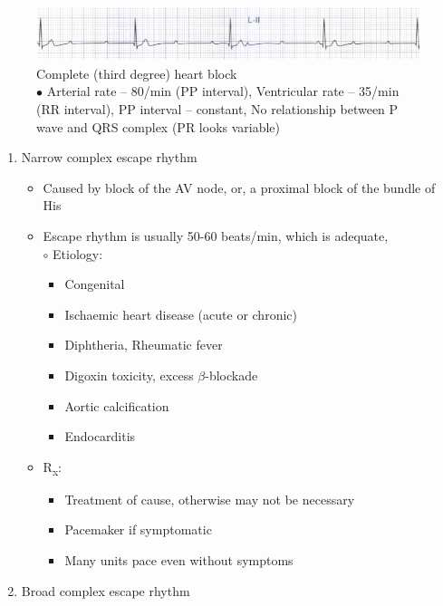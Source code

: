\documentclass[11pt,a4paper]{report}
\begin{document}
\begin{enumerate}
\begin{enumerate}
\begin{itemize}
		\end{itemize}
		\begin{figure}[htp]
			\centering \includegraphics[scale=.91]{ecg-heartblock-3.png}
			\centering \caption[Third degree heart block]{Complete (third degree) heart block\\$\bullet$ Arterial rate -- 80/min (PP interval), Ventricular rate -- 35/min (RR interval), PP interval -- constant, No relationship between P wave and QRS complex (PR looks variable) \cite{abdullah-ecg}}
			\label{ecg-heartblock-3}
		\end{figure}
		\begin{enumerate}
			\item Narrow complex escape rhythm
			\begin{itemize}
				\item Caused by block of the AV node, or, a proximal block of the bundle of His 
				\item Escape rhythm is usually 50-60 beats/min, which is adequate, \\
				{\color{red}$\circ$} Etiology:
				\begin{itemize}
					\item Congenital
					\item Ischaemic heart disease (acute or chronic)
					\item Diphtheria, Rheumatic fever
					\item Digoxin toxicity, excess $\beta$-blockade 
					\item Aortic calcification 
					\item Endocarditis 
				\end{itemize}
				\item R\textsubscript{x}:
				\begin{itemize}
					\item Treatment of cause, otherwise may not be necessary 
					\item Pacemaker if symptomatic
					\item Many units pace even without symptoms
				\end{itemize}
			\end{itemize}
			\item Broad complex escape rhythm 
			\begin{itemize}

\end{itemize}
\end{enumerate}
\end{enumerate}
\end{enumerate}
\end{document}
